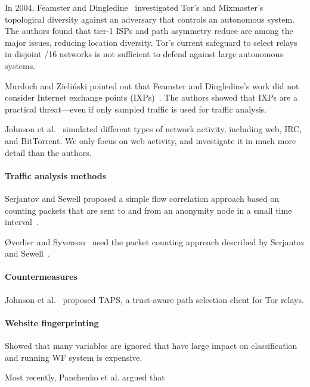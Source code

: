 In 2004, Feamster and Dingledine~\cite{Feamster2004a} investigated Tor's and
Mixmaster's topological diversity against an adversary that controls an
autonomous system.  The authors found that tier-1 ISPs and path asymmetry reduce
are among the major issues, reducing location diversity.  Tor's current
safeguard to select relays in disjoint /16 networks is not sufficient to defend
against large autonomous systems.

Murdoch and Zieli\'{n}ski pointed out that Feamster and Dingledine's work did
not consider Internet exchange points (IXPs)~\cite{Murdoch2007a}.  The authors
showed that IXPs are a practical threat---even if only sampled traffic is used
for traffic analysis.

Johnson et al.~\cite{Johnson2013a} simulated different types of network
activity, including web, IRC, and BitTorrent.  We only focus on web activity,
and investigate it in much more detail than the authors.

\paragraph{Traffic analysis methods}
Serjantov and Sewell proposed a simple flow correlation approach based on
counting packets that are sent to and from an anonymity node in a small time
interval~\cite{Serjantov2003a}.

\O{}verlier and Syverson~\cite{Overlier2006a} used the packet counting approach
described by Serjantov and Sewell~\cite{Serjantov2003a}.

\cite{Goldberg2010a}

\cite{Juen2015a}

\paragraph{Countermeasures}
\cite{Edman2009a}
\cite{Nithyanand2016a}
\cite{Akhoondi2012a}


\cite{Mathewson2004a}
\cite{Mittal2011a}
\cite{Wacek2013a}
\cite{Johnson2013a}
\cite{Juen2015a}
\cite{Danezis2004a}
\cite{Levine2004a}
\cite{Bauer2007a}
\cite{Dingledine2009a}


Johnson et al.~\cite{Johnson2015a} proposed TAPS, a trust-aware path selection
client for Tor relays.

\cite{torstinks}

\paragraph{Website fingerprinting}
\cite{Juarez2014a}
Showed that many variables are ignored that have large impact on classification
and running WF system is expensive.

Most recently, Panchenko et al. argued that 
\cite{Panchenko2016a}
